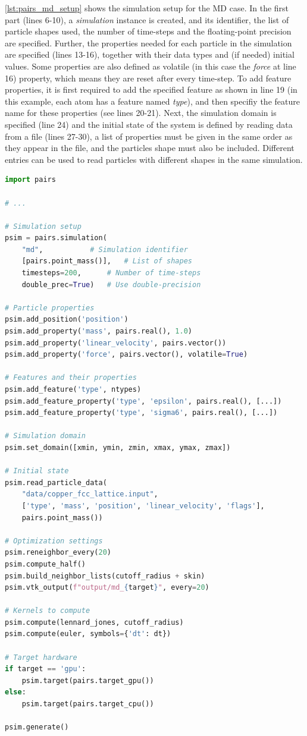 \documentclass[preprint,12pt]{elsarticle}
\begin{document}
\autoref{lst:pairs_md_setup} shows the simulation setup for the \ac{MD} case. In the first part (lines 6-10), a \emph{simulation} instance is created, and its identifier, the list of particle shapes used, the number of time-steps and the floating-point precision are specified.
Further, the properties needed for each particle in the simulation are specified (lines 13-16), together with their data types and (if needed) initial values.
Some properties are also defined as volatile (in this case the \emph{force} at line 16) property, which means they are reset after every time-step.
To add feature properties, it is first required to add the specified feature as shown in line 19 (in this example, each atom has a feature named \emph{type}), and then specifiy the feature name for these properties (see lines 20-21).
Next, the simulation domain is specified (line 24) and the initial state of the system is defined by reading data from a file (lines 27-30), a list of properties must be given in the same order as they appear in the file, and the particles shape must also be included.
Different entries can be used to read particles with different shapes in the same simulation.

\begin{lstlisting}[language=Python,
		   label={lst:pairs_md_setup},
		   caption={Simple example for MD simulation setup in P4IRS.}]
import pairs

# ...

# Simulation setup
psim = pairs.simulation(
	"md", 			# Simulation identifier
	[pairs.point_mass()], 	# List of shapes
	timesteps=200,		# Number of time-steps
	double_prec=True)	# Use double-precision

# Particle properties
psim.add_position('position')
psim.add_property('mass', pairs.real(), 1.0)
psim.add_property('linear_velocity', pairs.vector())
psim.add_property('force', pairs.vector(), volatile=True)

# Features and their properties
psim.add_feature('type', ntypes)
psim.add_feature_property('type', 'epsilon', pairs.real(), [...])
psim.add_feature_property('type', 'sigma6', pairs.real(), [...])

# Simulation domain
psim.set_domain([xmin, ymin, zmin, xmax, ymax, zmax])

# Initial state
psim.read_particle_data(
	"data/copper_fcc_lattice.input",
	['type', 'mass', 'position', 'linear_velocity', 'flags'],
	pairs.point_mass())

# Optimization settings
psim.reneighbor_every(20)
psim.compute_half()
psim.build_neighbor_lists(cutoff_radius + skin)
psim.vtk_output(f"output/md_{target}", every=20)

# Kernels to compute
psim.compute(lennard_jones, cutoff_radius)
psim.compute(euler, symbols={'dt': dt})

# Target hardware
if target == 'gpu':
    psim.target(pairs.target_gpu())
else:
    psim.target(pairs.target_cpu())

psim.generate()
\end{lstlisting}
\end{document}
